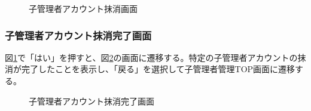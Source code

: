 \documentclass[a4j]{jarticle}
\begin{document}
\begin{figure}[H]
\centering
{}
\caption{子管理者アカウント抹消画面}
\label{fig:delete_admin}
\end{figure}

\subsubsection{子管理者アカウント抹消完了画面}

図\ref{fig:delete_admin}で「はい」を押すと、図\ref{fig:delete_admin_ok}の画面に遷移する。特定の子管理者アカウントの抹消が完了したことを表示し、「戻る」を選択して子管理者管理TOP画面に遷移する。
\begin{figure}[H]
\centering
{}
\caption{子管理者アカウント抹消完了画面}
\label{fig:delete_admin_ok}
\end{figure}

\end{document}
